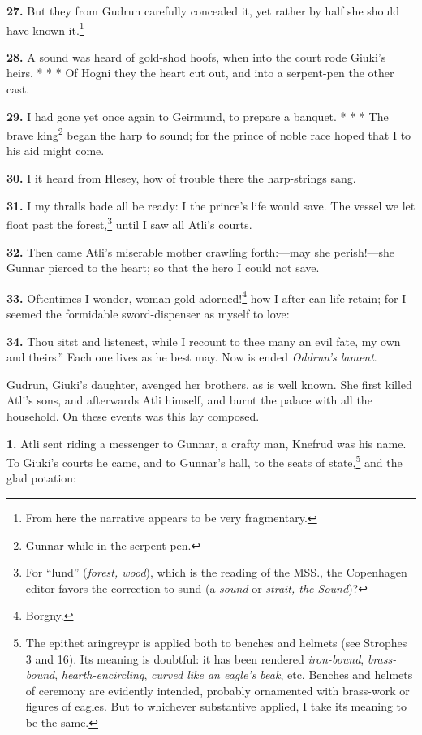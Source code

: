 \textbf{27.} But they from Gudrun carefully concealed it, yet rather by half
she should have known it.\footnote{From here the narrative appears to be very fragmentary.}

\textbf{28.} A sound was heard of gold-shod hoofs, when into the court rode
Giuki's heirs. * * * Of Hogni they the heart cut out, and into a
serpent-pen the other cast.

\textbf{29.} I had gone yet once again to Geirmund, to prepare a banquet. * *
* The brave king\footnote{Gunnar while in the serpent-pen.} began the harp to sound; for the prince of noble
race hoped that I to his aid might come.

\textbf{30.} I it heard from Hlesey, how of trouble there the harp-strings
sang.

\textbf{31.} I my thralls bade all be ready: I the prince's life would save.
The vessel we let float past the forest,\footnote{For ``lund'' (\emph{forest, wood}), which is the reading of the
MSS., the Copenhagen editor favors the correction to sund (a \emph{sound}
or \emph{strait, the Sound})?} until I saw all Atli's
courts.

\textbf{32.} Then came Atli's miserable mother crawling forth:—may she
perish!—she Gunnar pierced to the heart; so that the hero I could not
save.

\textbf{33.} Oftentimes I wonder, woman gold-adorned!\footnote{Borgny.} how I after can
life retain; for I seemed the formidable sword-dispenser as myself to
love:

\textbf{34.} Thou sitst and listenest, while I recount to thee many an evil
fate, my own and theirs.'' Each one lives as he best may. Now is ended
\emph{Oddrun's lament}.


Gudrun, Giuki's daughter, avenged her brothers, as is well known. She
first killed Atli's sons, and afterwards Atli himself, and burnt the
palace with all the household. On these events was this lay composed.

\textbf{1.} Atli sent riding a messenger to Gunnar, a crafty man, Knefrud was
his name. To Giuki's courts he came, and to Gunnar's hall, to the
seats of state,\footnote{The epithet aringreypr is applied both to benches and
helmets (see Strophes 3 and 16). Its meaning is doubtful: it has been
rendered \emph{iron-bound}, \emph{brass-bound}, \emph{hearth-encircling}, \emph{curved
like an eagle's beak}, etc. Benches and helmets of ceremony are
evidently intended, probably ornamented with brass-work or figures of
eagles. But to whichever substantive applied, I take its meaning to be
the same.} and the glad potation:


